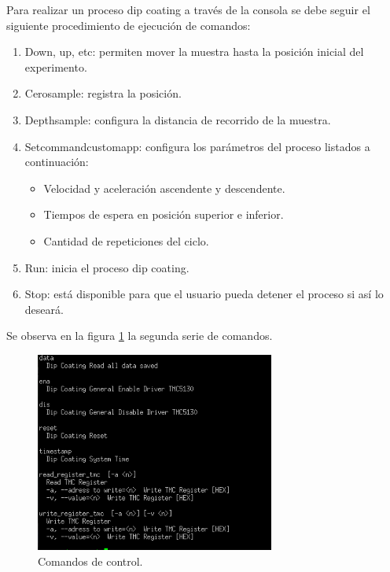 Para realizar un proceso dip coating a través de la consola se debe seguir el siguiente procedimiento de ejecución de comandos:
\begin{enumerate}
\item Down, up, etc: permiten mover la muestra hasta la posición inicial del experimento.
\item Cerosample: registra la posición.
\item Depthsample: configura la distancia de recorrido de la muestra.
\item Setcommandcustomapp: configura los parámetros del proceso listados a continuación:

\begin{itemize}
\item Velocidad y aceleración ascendente y descendente.
\item Tiempos de espera en posición superior e inferior.
\item Cantidad de repeticiones del ciclo.
\end{itemize}

\item Run: inicia el proceso dip coating.
\item Stop: está disponible para que el usuario pueda detener el proceso si así lo deseará.

\end{enumerate}


Se observa en la figura \ref{fig:consola_comandos} la segunda serie de comandos. 

\begin{figure}[h!]
	\centering
	\includegraphics[width=0.7\textwidth]{./Figures/consola_3.png}
	\caption{Comandos de control.}
	\label{fig:consola_comandos}
\end{figure}

